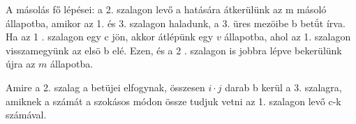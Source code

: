 A másolás fő lépései: a 2. szalagon levő a hatására átkerülünk az m másoló állapotba, amikor az 1. és 3. szalagon haladunk, a 3. üres mezöibe b betǘt írva. Ha az 1 . szalagon egy c jön, akkor átlépünk egy $v$ állapotba, ahol az 1. szalagon visszamegyünk az elsö b elé. Ezen, és a 2 . szalagon is jobbra lépve bekerülünk újra az $m$ állapotba.

Amire a 2. szalag a betüjei elfogynak, összesen $i \cdot j$ darab b kerül a 3. szalagra, amiknek a számát a szokásos módon össze tudjuk vetni az 1. szalagon levő c-k számával.